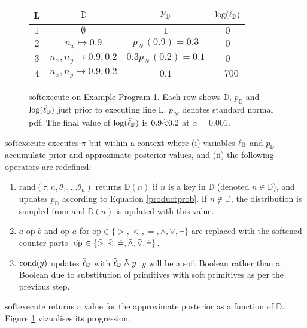 \begin{figure}
\begin{center}
  \begin{tabular}{ |c|c|c|c| } 
   \hline
   L & $\mathbb{D}$ &  $p_\mathbb{D}$ & $\log(\tilde{\ell}_\mathbb{D})$ \\
   \hline
   $1$ & $\emptyset$ & $1$ & $0$ \\ 
   $2$ & $ n_x \mapsto 0.9$ & $p_\mathcal{N}(0.9) = 0.3$ & $0$ \\ 
   $3$ &  $n_x, n_y \mapsto 0.9, 0.2$ & $0.3 p_\mathcal{N}(0.2) = 0.1$ & $0$ \\
   $4$ & $n_x, n_y \mapsto 0.9, 0.2$ & $0.1$ & $-700$ \\ 
   \hline
  \end{tabular}
\end{center}
\caption{softexecute on Example Program 1.  Each row shows $\mathbb{D}$,  $p_\mathbb{D}$ and $\log(\tilde{\ell}_\mathbb{D})$ just prior to executing line L.  $p_\mathcal{N}$ denotes standard normal pdf.  The final value of $\log(\tilde{\ell}_\mathbb{D})$ is $0.9 \tilde{<} 0.2$ at $\alpha = 0.001$.}
\label{table:sofex}
\end{figure}


$\textrm{softexecute}$ executes $\pi$ but within a context where (i) variables $\operatorname{\ell}_\mathbb{D}$ and $p_\mathbb{D}$ accumulate prior and approximate posterior values, and (ii) the following operators are redefined:

\begin{enumerate}
  \item $\textrm{rand}(\tau, n, \theta_1, ...\theta_n)$ returns $\mathbb{D}(n)$ if $n$ is a key in $\mathbb{D}$ (denoted $n \in \mathbb{D}$), and updates $p_\mathbb{D}$ according to Equation \ref{productprob}. If $n \notin \mathbb{D}$, the distribution is sampled from and $\mathbb{D}(n)$ is updated with this value.  
  \item $a \text{ op } b$ and $\textrm{op } a$ for $\textrm{op} \in \{>, <, =, \land, \lor, \neg\}$ are replaced with the softened counter-parts $\mathrel{\tilde{\textrm{ op }}} \in \{\mathrel{\tilde{>}}, \mathrel{\tilde{<}}, \mathrel{\tilde{=}}, \mathrel{\tilde{\land}}, \mathrel{\tilde{\lor}}, \mathrel{\tilde{\neg}}\}$.
  \item $\operatorname{cond}(y)$ updates $\tilde{\operatorname{\ell}}_\mathbb{D}$ with $\tilde{\operatorname{\ell}}_\mathbb{D} \mathrel{\tilde{\land}} y$. $y$ will be a soft Boolean rather than a Boolean due to substitution of primitives with soft primitives as per the previous step.
\end{enumerate}

$\textrm{softexecute}$ returns a value for the approximate posterior as a function of $\mathbb{D}$.  Figure \ref{table:sofex} vizualises its progression.

